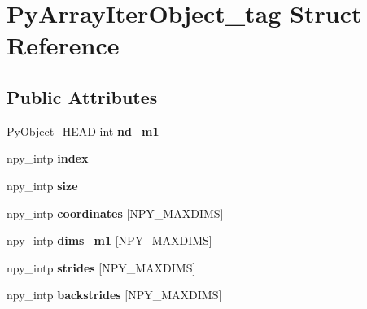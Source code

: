 \hypertarget{structPyArrayIterObject__tag}{}\section{Py\+Array\+Iter\+Object\+\_\+tag Struct Reference}
\label{structPyArrayIterObject__tag}
\subsection*{Public Attributes}
\begin{DoxyCompactItemize}
\item 
Py\+Object\+\_\+\+H\+E\+AD int {\bfseries nd\+\_\+m1}\hypertarget{structPyArrayIterObject__tag_ad6bb7cfccf694f175e79db11a3d08967}{}\label{structPyArrayIterObject__tag_ad6bb7cfccf694f175e79db11a3d08967}

\item 
npy\+\_\+intp {\bfseries index}\hypertarget{structPyArrayIterObject__tag_ae34c2d51d4c70eb68b1bab2ba901decc}{}\label{structPyArrayIterObject__tag_ae34c2d51d4c70eb68b1bab2ba901decc}

\item 
npy\+\_\+intp {\bfseries size}\hypertarget{structPyArrayIterObject__tag_a7b184f040a3c394855de406fa4fb9f61}{}\label{structPyArrayIterObject__tag_a7b184f040a3c394855de406fa4fb9f61}

\item 
npy\+\_\+intp {\bfseries coordinates} \mbox{[}N\+P\+Y\+\_\+\+M\+A\+X\+D\+I\+MS\mbox{]}\hypertarget{structPyArrayIterObject__tag_ab136ee98a7c5e82ca3c1ee1afa6fb9da}{}\label{structPyArrayIterObject__tag_ab136ee98a7c5e82ca3c1ee1afa6fb9da}

\item 
npy\+\_\+intp {\bfseries dims\+\_\+m1} \mbox{[}N\+P\+Y\+\_\+\+M\+A\+X\+D\+I\+MS\mbox{]}\hypertarget{structPyArrayIterObject__tag_a7ad6a67a977e2c176c393101559f952d}{}\label{structPyArrayIterObject__tag_a7ad6a67a977e2c176c393101559f952d}

\item 
npy\+\_\+intp {\bfseries strides} \mbox{[}N\+P\+Y\+\_\+\+M\+A\+X\+D\+I\+MS\mbox{]}\hypertarget{structPyArrayIterObject__tag_a04c900bcbd8883fe785c2a8e36cc3948}{}\label{structPyArrayIterObject__tag_a04c900bcbd8883fe785c2a8e36cc3948}

\item 
npy\+\_\+intp {\bfseries backstrides} \mbox{[}N\+P\+Y\+\_\+\+M\+A\+X\+D\+I\+MS\mbox{]}\hypertarget{structPyArrayIterObject__tag_a4acf509853a27da8a2bb225b5aa1d470}{}\label{structPyArrayIterObject__tag_a4acf509853a27da8a2bb225b5aa1d470}


\end{DoxyCompactItemize}

